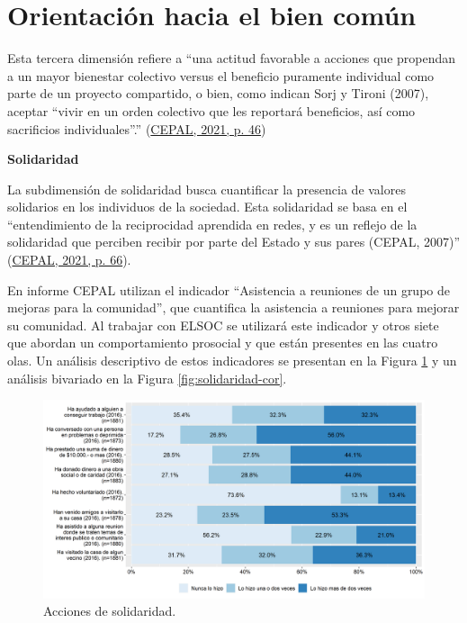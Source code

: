 \documentclass[
  12pt,
]{book}
\begin{document}
\hypertarget{orientaciuxf3n-hacia-el-bien-comuxfan}{%
\section{Orientación hacia el bien común}\label{orientaciuxf3n-hacia-el-bien-comuxfan}}

Esta tercera dimensión refiere a ``una actitud favorable a acciones que propendan a un mayor bienestar colectivo versus el beneficio puramente individual como parte de un proyecto compartido, o bien, como indican Sorj y Tironi (2007), aceptar ``vivir en un orden colectivo que les reportará beneficios, así como sacrificios individuales''.'' (\protect\hyperlink{ref-cepal_Cohesion_2021}{CEPAL, 2021, p. 46})

\textbf{Solidaridad}

La subdimensión de solidaridad busca cuantificar la presencia de valores solidarios en los individuos de la sociedad. Esta solidaridad se basa en el ``entendimiento de la reciprocidad aprendida en redes, y es un reflejo de la solidaridad que perciben recibir por parte del Estado y sus pares (CEPAL, 2007)'' (\protect\hyperlink{ref-cepal_Cohesion_2021}{CEPAL, 2021, p. 66}).

En informe CEPAL utilizan el indicador ``Asistencia a reuniones de un grupo de mejoras para la comunidad'', que cuantifica la asistencia a reuniones para mejorar su comunidad. Al trabajar con ELSOC se utilizará este indicador y otros siete que abordan un comportamiento prosocial y que están presentes en las cuatro olas. Un análisis descriptivo de estos indicadores se presentan en la Figura \ref{fig:solidaridad} y un análisis bivariado en la Figura \ref{fig:solidaridad-cor}.

\begin{figure}[H]

{\centering \includegraphics[width=1\linewidth,height=1\textheight]{output/graphs/solidaridad} 

}

\caption{Acciones de solidaridad.}\label{fig:solidaridad}
\end{figure}
\end{document}
